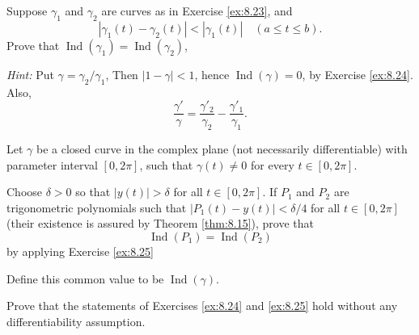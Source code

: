 \begin{myExercise}
    \label{ex:8.25}
    Suppose $\gamma_1$ and $\gamma_2$ are curves as in Exercise \ref{ex:8.23}, and
    \begin{equation*}
        | \gamma_1(t) - \gamma_2(t) | < | \gamma_1(t) |
        \quad
        (a \leq t \leq b).
    \end{equation*}
    Prove that $\operatorname{Ind} (\gamma_1) = \operatorname{Ind} (\gamma_2)$,
    
    \emph{Hint:} Put $\gamma = \gamma_2/\gamma_1$, Then $|1 - \gamma| < 1$, hence $\operatorname{Ind} (\gamma) = 0$, by Exercise \ref{ex:8.24}. Also,
    \begin{equation*}
        \frac{\gamma'}{\gamma} =
        \frac{\gamma'_2}{\gamma_2} -
        \frac{\gamma'_1}{\gamma_1} .
    \end{equation*}
\end{myExercise}


\begin{myExercise}
    \label{ex:8.26}
    Let $\gamma$ be a closed curve in the complex plane (not necessarily differentiable) with parameter interval $[0, 2\pi]$, such that $\gamma(t) \neq 0$ for every $t \in [0, 2\pi]$.
    
    Choose $\delta > 0$ so that $| y(t) | > \delta$ for all $t \in [0, 2\pi]$. 
    If $P_1$ and $P_2$ are trigonometric polynomials such that $|P_1(t) -y(t) | < \delta/4$ for all $t \in [0, 2\pi]$ (their existence is assured by Theorem \ref{thm:8.15}), prove that
    \begin{equation*}
        \operatorname{Ind}(P_1) =
        \operatorname{Ind}(P_2) 
    \end{equation*}
    by applying Exercise \ref{ex:8.25}

    Define this common value to be $\operatorname{Ind}(\gamma)$.

    Prove that the statements of Exercises \ref{ex:8.24} and \ref{ex:8.25} hold without any differentiability assumption.
\end{myExercise}


